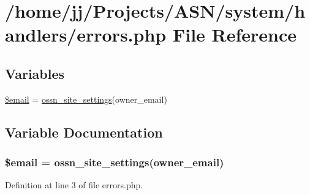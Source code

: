 \hypertarget{errors_8php}{}\section{/home/jj/\+Projects/\+A\+S\+N/system/handlers/errors.php File Reference}
\label{errors_8php}
\subsection*{Variables}
\begin{DoxyCompactItemize}
\item 
\hyperlink{errors_8php_ad634f418b20382e2802f80532d76d3cd}{\$email} = \hyperlink{ossn_8lib_8system_8php_a610e2045b8a86c09f777b4d82e24e34c}{ossn\+\_\+site\+\_\+settings}(\textquotesingle{}owner\+\_\+email\textquotesingle{})
\end{DoxyCompactItemize}


\subsection{Variable Documentation}
\subsubsection[{\texorpdfstring{\$email}{$email}}]{\setlength{\rightskip}{0pt plus 5cm}\${\bf email} = {\bf ossn\+\_\+site\+\_\+settings}(\textquotesingle{}owner\+\_\+email\textquotesingle{})}\hypertarget{errors_8php_ad634f418b20382e2802f80532d76d3cd}{}\label{errors_8php_ad634f418b20382e2802f80532d76d3cd}


Definition at line 3 of file errors.\+php.

